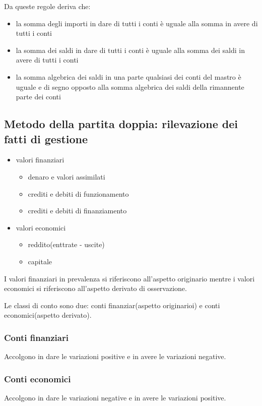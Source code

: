 Da queste regole deriva che:
\begin{itemize}
    \item la somma degli importi in dare di tutti i conti è uguale alla somma in avere di tutti i conti
    \item la somma dei saldi in dare di tutti i conti è uguale alla somma dei saldi in avere di tutti i conti
    \item la somma algebrica dei saldi in una parte qualsiasi dei conti del mastro è uguale e di segno opposto alla somma algebrica dei saldi della rimannente parte dei conti
\end{itemize}

\subsection{Metodo della partita doppia: rilevazione dei fatti di gestione}
\begin{itemize}
    \item valori finanziari
        \begin{itemize}
            \item denaro e valori assimilati
            \item crediti e debiti di funzionamento
            \item crediti e debiti di finanziamento
        \end{itemize}
    \item valori economici
        \begin{itemize}
            \item reddito(enttrate - uscite)
            \item capitale
        \end{itemize}
\end{itemize}

I valori finanziari in prevalenza si riferiscono all'aspetto
originario mentre i valori economici si riferiscono
all'aspetto derivato di osservazione.

Le classi di conto sono due: conti finanziar(aspetto originarioi) e conti economici(aspetto derivato).


\subsubsection{Conti finanziari}
Accolgono in dare le variazioni positive e in avere le variazioni negative.

\subsubsection{Conti economici}
Accolgono in dare le variazioni negative e in avere le variazioni positive.

